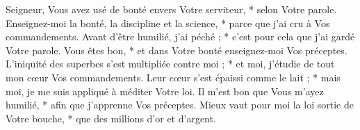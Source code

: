 Seigneur, Vous avez usé de bonté envers Votre serviteur, * selon Votre parole.
\versseparator
Enseignez-moi la bonté, la discipline et la science, * parce que j'ai cru à Vos commandements.
\versseparator
Avant d'être humilié, j'ai péché ; * c'est pour cela que j'ai gardé Votre parole.
\versseparator
Vous êtes bon, * et dans Votre bonté enseignez-moi Vos préceptes.
\versseparator
L'iniquité des superbes s'est multipliée contre moi ; * et moi, j'étudie de tout mon cœur Vos commandements.
\versseparator
Leur cœur s'est épaissi comme le lait ; * mais moi, je me suis appliqué à méditer Votre loi.
\versseparator
Il m'est bon que Vous m'ayez humilié, * afin que j'apprenne Vos préceptes.
\versseparator
Mieux vaut pour moi la loi sortie de Votre bouche, * que des millions d'or et d'argent.
